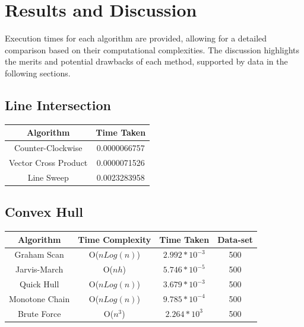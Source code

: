 \documentclass[a4paper, 10pt, twocolumn]{article}
\begin{document}
\newpage
\section{Results and Discussion}
Execution times for each algorithm are provided, allowing for a detailed comparison based on their computational complexities. 
The discussion highlights the merits and potential drawbacks of each method, supported by data in the following sections.

\subsection{Line Intersection}
\begin{center}
  \centering
  \begin{tabular}{|c|c|}
    \hline
    \textbf {Algorithm} & \textbf {Time Taken} \\
    \hline
    Counter-Clockwise & 0.0000066757\\
    \hline
    Vector Cross Product & 0.0000071526\\
    \hline
    Line Sweep & 0.0023283958\\
    \hline
  \end{tabular}
\end{center}

\subsection{Convex Hull}
\begin{center}
  \centering
  \begin{tabular}{|c|c|c|c|}
    \hline
    \textbf {Algorithm} & \textbf {Time Complexity} & \textbf {Time Taken} & \textbf {Data-set}\\
    \hline %
    Graham Scan & O($nLog(n)$) & $2.992*10^{-3}$ & 500\\
    \hline %
    Jarvis-March & O($nh$) & $5.746*10^{-5}$ & 500\\
    \hline %
    Quick Hull & O($nLog(n)$) & $3.679*10^{-3}$ & 500\\
    \hline %
    Monotone Chain & O($nLog(n)$) & $9.785*10^{-4}$ & 500\\
    \hline %
    Brute Force & O($n^3$) & $2.264*10^{3}$ & 500\\
    \hline
  \end{tabular}
\end{center}
\end{document}
